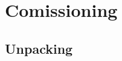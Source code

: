\documentclass[11pt]{report}
\begin{document}
	
\chapter{Comissioning}
\section{Unpacking}
\blindtext
\end{document}
